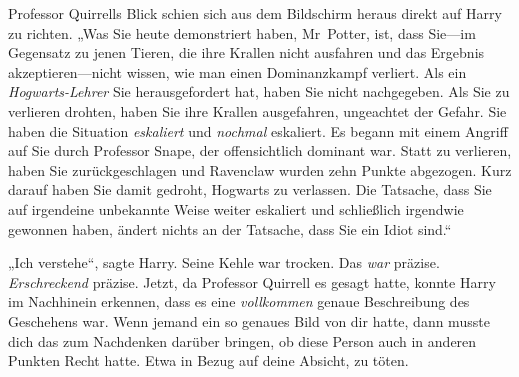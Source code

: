 Professor Quirrells Blick schien sich aus dem Bildschirm heraus direkt auf Harry zu richten. „Was Sie heute demonstriert haben, Mr~Potter, ist, dass Sie—im Gegensatz zu jenen Tieren, die ihre Krallen nicht ausfahren und das Ergebnis akzeptieren—nicht wissen, wie man einen Dominanzkampf verliert. Als ein \emph{Hogwarts-Lehrer} Sie herausgefordert hat, haben Sie nicht nachgegeben. Als Sie zu verlieren drohten, haben Sie ihre Krallen ausgefahren, ungeachtet der Gefahr. Sie haben die Situation \emph{eskaliert} und \emph{nochmal} eskaliert. Es begann mit einem Angriff auf Sie durch Professor Snape, der offensichtlich dominant war. Statt zu verlieren, haben Sie zurückgeschlagen und Ravenclaw wurden zehn Punkte abgezogen. Kurz darauf haben Sie damit gedroht, Hogwarts zu verlassen. Die Tatsache, dass Sie auf irgendeine unbekannte Weise weiter eskaliert und schließlich irgendwie gewonnen haben, ändert nichts an der Tatsache, dass Sie ein Idiot sind.“

„Ich verstehe“, sagte Harry. Seine Kehle war trocken. Das \emph{war} präzise. \emph{Erschreckend} präzise. Jetzt, da Professor Quirrell es gesagt hatte, konnte Harry im Nachhinein erkennen, dass es eine \emph{vollkommen} genaue Beschreibung des Geschehens war. Wenn jemand ein so genaues Bild von dir hatte, dann musste dich das zum Nachdenken darüber bringen, ob diese Person auch in anderen Punkten Recht hatte. Etwa in Bezug auf deine Absicht, zu töten.

